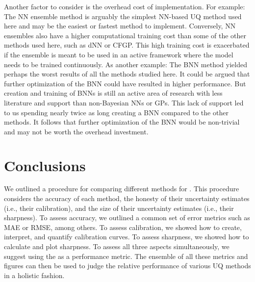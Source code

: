 \documentclass[]{achemso}
\begin{document}
Another factor to consider is the overhead cost of implementation.
For example:  The \gls{NN} ensemble method is arguably the simplest \gls{NN}-based \gls{UQ} method used here and may be the easiest or fastest method to implement.
Conversely, \gls{NN} ensembles also have a higher computational training cost than some of the other methods used here, such as \gls{dNN} or \gls{CFGP}.
This high training cost is exacerbated if the ensemble is meant to be used in an active framework where the model needs to be trained continuously.
As another example:  The \gls{BNN} method yielded perhaps the worst results of all the methods studied here.
It could be argued that further optimization of the \gls{BNN} could have resulted in higher performance.
But creation and training of \gls{BNN}s is still an active area of research with less literature and support than non-Bayesian \gls{NN}s or \gls{GP}s.
This lack of support led to us spending nearly twice as long creating a \gls{BNN} compared to the other methods.
It follows that further optimization of the \gls{BNN} would be non-trivial and may not be worth the overhead investment.



\section{Conclusions}

We outlined a procedure for comparing different methods for .
This procedure considers the accuracy of each method, the honesty of their uncertainty estimates (i.e., their calibration), and the size of their uncertainty estimates (i.e., their sharpness).
To assess accuracy, we outlined a common set of error metrics such as \gls{MAE} or \gls{RMSE}, among others.
To assess calibration, we showed how to create, interpret, and quantify calibration curves.
To assess sharpness, we showed how to calculate and plot sharpness.
To assess all three aspects simultaneously, we suggest using the  as a performance metric.
The ensemble of all these metrics and figures can then be used to judge the relative performance of various UQ methods in a holistic fashion.
\end{document}
